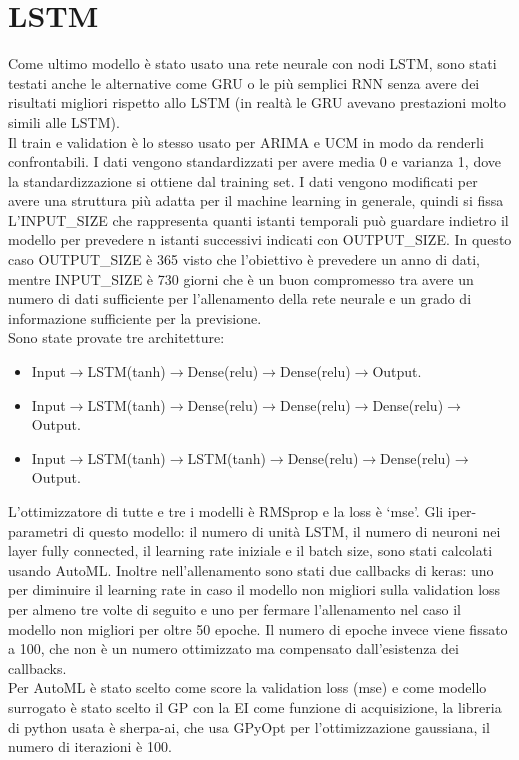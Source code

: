 \documentclass[12pt, onecolumn]{article}
\begin{document}
\section*{LSTM}
Come ultimo modello è stato usato una rete neurale con nodi LSTM, sono stati testati anche le alternative come GRU o le più semplici RNN senza avere dei risultati migliori rispetto allo LSTM (in realtà le GRU avevano prestazioni molto simili alle LSTM).\\
Il train e validation è lo stesso usato per ARIMA e UCM in modo da renderli confrontabili.
I dati vengono standardizzati per avere media 0 e varianza 1, dove la standardizzazione si ottiene dal training set.
I dati vengono modificati per avere una struttura più adatta per il machine learning in generale, quindi si fissa L'INPUT\_SIZE che rappresenta quanti istanti temporali può guardare indietro il modello per prevedere n istanti successivi indicati con OUTPUT\_SIZE.
In questo caso OUTPUT\_SIZE è 365 visto che l'obiettivo è prevedere un anno di dati, mentre INPUT\_SIZE è 730 giorni che è un buon compromesso tra avere un numero di dati sufficiente per l'allenamento della rete neurale e un grado di informazione sufficiente per la previsione.\\
Sono state provate tre architetture:
\begin{itemize}[leftmargin=*]
\item Input$\to$LSTM(tanh)$\to$Dense(relu)$\to$Dense(relu)$\to$Output.
\item Input$\to$LSTM(tanh)$\to$Dense(relu)$\to$Dense(relu)$\to$Dense(relu)$\to$Output.
\item Input$\to$LSTM(tanh)$\to$LSTM(tanh)$\to$Dense(relu)$\to$Dense(relu)$\to$Output.
\end{itemize}
L'ottimizzatore di tutte e tre i modelli è RMSprop e la loss è `mse'. Gli iper-parametri di questo modello: il numero di unità LSTM, il numero di neuroni nei layer fully connected, il learning rate iniziale e il batch size, sono stati calcolati usando AutoML.
Inoltre nell'allenamento sono stati due callbacks di keras: uno per diminuire il learning rate in caso il modello non migliori sulla validation loss per almeno tre volte di seguito e uno per fermare l'allenamento nel caso il modello non migliori per oltre 50 epoche.
Il numero di epoche invece viene fissato a 100, che non è un numero ottimizzato ma compensato dall'esistenza dei callbacks.\\
Per AutoML è stato scelto come score la validation loss (mse) e come modello surrogato è stato scelto il GP con la EI come funzione di acquisizione, la libreria di python usata è sherpa-ai, che usa GPyOpt per l'ottimizzazione gaussiana, il numero di iterazioni è 100.\\
\end{document}
